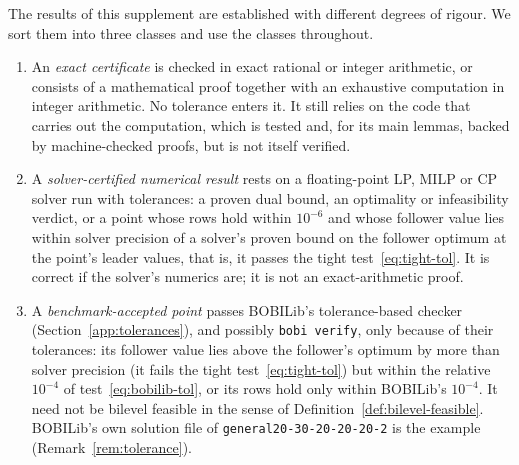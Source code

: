 The results of this supplement are established with different degrees of
rigour. We sort them into three classes and use the classes throughout.

\begin{definition}\label{def:classes}
\leavevmode
\begin{enumerate}
\item[(i)] An \emph{exact certificate} is checked in exact rational or
integer arithmetic, or consists of a mathematical proof together with an
exhaustive computation in integer arithmetic. No tolerance enters it. It
still relies on the code that carries out the computation, which is tested
and, for its main lemmas, backed by machine-checked proofs, but is not itself
verified.
\item[(ii)] A \emph{solver-certified numerical result} rests on a
floating-point LP, MILP or CP solver run with tolerances: a proven dual bound,
an optimality or infeasibility verdict, or a point whose rows hold within
$10^{-6}$ and whose follower value lies within solver precision of a solver's
proven bound on the follower optimum at the point's leader values, that is,
it passes the tight test~\eqref{eq:tight-tol}. It is correct if the solver's
numerics are; it is not an exact-arithmetic proof.
\item[(iii)] A \emph{benchmark-accepted point} passes BOBILib's
tolerance-based checker (Section~\ref{app:tolerances}), and possibly
\texttt{bobi verify}, only because of their tolerances: its follower value
lies above the follower's optimum by more than solver precision (it fails the
tight test~\eqref{eq:tight-tol}) but within the relative $10^{-4}$ of
test~\eqref{eq:bobilib-tol}, or its rows hold only within BOBILib's $10^{-4}$.
It need not be bilevel feasible in the sense of
Definition~\ref{def:bilevel-feasible}. BOBILib's own solution file of
\texttt{general20-30-20-20-20-2} is the example (Remark~\ref{rem:tolerance}).
\end{enumerate}
\end{definition}

